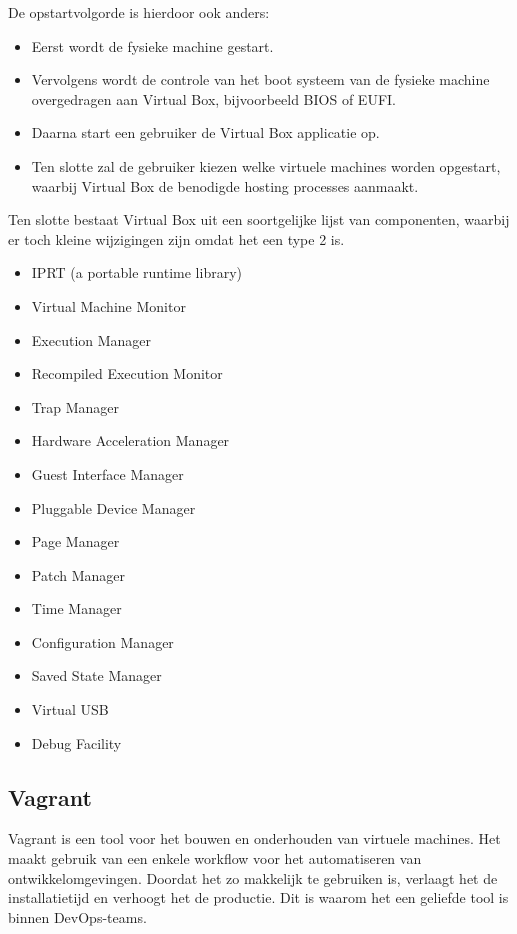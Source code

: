 De opstartvolgorde is hierdoor ook anders:
\begin{itemize}[noitemsep]
	\item Eerst wordt de fysieke machine gestart.
	\item Vervolgens wordt de controle van het boot systeem van de fysieke machine overgedragen aan Virtual Box, bijvoorbeeld BIOS of EUFI.
	\item Daarna start een gebruiker de Virtual Box applicatie op.
	\item Ten slotte zal de gebruiker kiezen welke virtuele machines worden opgestart, waarbij Virtual Box de benodigde hosting processes aanmaakt.
\end{itemize}

Ten slotte bestaat Virtual Box uit een soortgelijke lijst van componenten, waarbij er toch kleine wijzigingen zijn omdat het een type 2 is.
\begin{itemize}[noitemsep]
	\item IPRT (a portable runtime library)
	\item Virtual Machine Monitor
	\item Execution Manager
	\item Recompiled Execution Monitor
	\item Trap Manager
	\item Hardware Acceleration Manager
	\item Guest Interface Manager
	\item Pluggable Device Manager
	\item Page Manager
	\item Patch Manager
	\item Time Manager
	\item Configuration Manager
	\item Saved State Manager
	\item Virtual USB
	\item Debug Facility
\end{itemize}

\subsection{Vagrant}
Vagrant is een tool voor het bouwen en onderhouden van virtuele machines. Het maakt gebruik van een enkele workflow voor het automatiseren van ontwikkelomgevingen. Doordat het zo makkelijk te gebruiken is, verlaagt het de installatietijd en verhoogt het de productie. Dit is waarom het een geliefde tool is binnen DevOps-teams.

